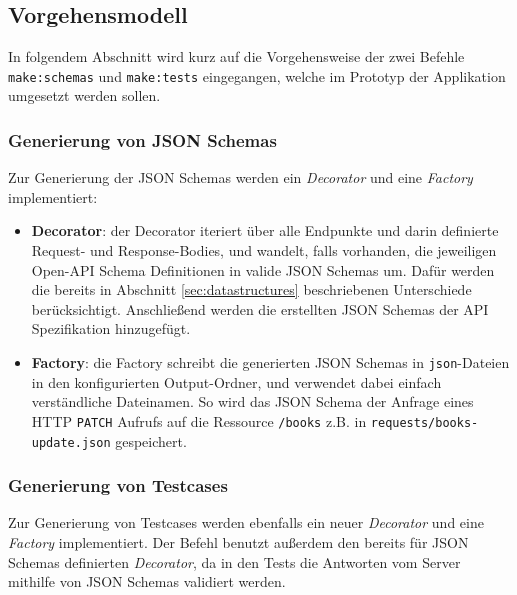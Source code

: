 \subsection{Vorgehensmodell}
In folgendem Abschnitt wird kurz auf die Vorgehensweise der zwei Befehle \lstinline|make:schemas| und \lstinline|make:tests| eingegangen, welche im Prototyp der Applikation umgesetzt werden sollen. 

\subsubsection{Generierung von JSON Schemas}
Zur Generierung der JSON Schemas werden ein \emph{Decorator} und eine \emph{Factory} implementiert:

\begin{itemize}
	\item \textbf{Decorator}: der Decorator iteriert über alle Endpunkte und darin definierte Request- und Response-Bodies, und wandelt, falls vorhanden, die jeweiligen Open-API Schema Definitionen in valide JSON Schemas um. Dafür werden die bereits in Abschnitt \ref{sec:datastructures} beschriebenen Unterschiede berücksichtigt. Anschließend werden die erstellten JSON Schemas der API Spezifikation hinzugefügt.
	\item \textbf{Factory}: die Factory schreibt die generierten JSON Schemas in \lstinline|json|-Dateien in den konfigurierten Output-Ordner, und verwendet dabei einfach verständliche Dateinamen. So wird das JSON Schema der Anfrage eines HTTP \lstinline|PATCH| Aufrufs auf die Ressource \lstinline|/books| z.B. in \lstinline|requests/books-update.json| gespeichert.
\end{itemize}

\subsubsection{Generierung von Testcases}
Zur Generierung von Testcases werden ebenfalls ein neuer \emph{Decorator} und eine \emph{Factory} implementiert. Der Befehl benutzt außerdem den bereits für JSON Schemas definierten \emph{Decorator}, da in den Tests die Antworten vom Server mithilfe von JSON Schemas validiert werden.

